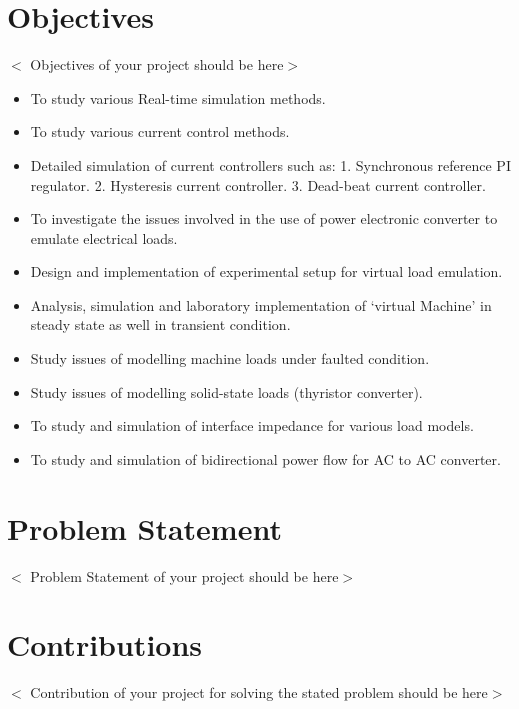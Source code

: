 \section{Objectives}
$<$ Objectives of your project should be here$>$\newline
\begin{itemize}
\item To study various Real-time simulation methods.
\item To study various current control methods.
\item Detailed simulation of current controllers such as:
1. Synchronous reference PI regulator.
2. Hysteresis current controller.
3. Dead-beat current controller. 
\item To investigate the issues involved in the use of power electronic converter to emulate electrical loads.
\item Design and implementation of experimental setup for virtual load emulation.
\item Analysis, simulation and laboratory implementation of `virtual Machine' in steady state as well in transient condition.
\item Study issues of modelling machine loads under faulted condition.
\item Study issues of modelling solid-state loads (thyristor converter).
\item To study and simulation of interface impedance for various load models.
\item To study and simulation of bidirectional power flow for AC to AC converter.
\end{itemize}
\section{Problem Statement}
$<$ Problem Statement of your project should be here$>$\newline
\section{Contributions}
$<$ Contribution of your project for solving the stated problem should be here$>$\newline
